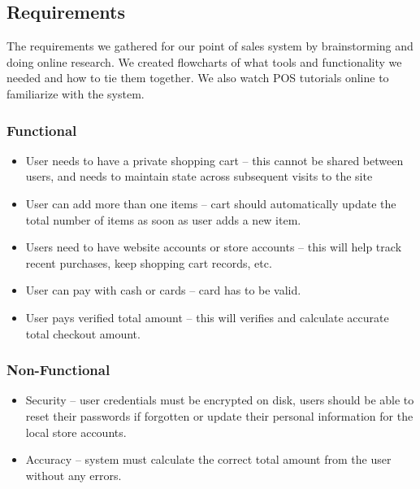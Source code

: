 \documentclass[10pt,conference,onecolumn,compsoc]{IEEEtran}
\begin{document}



\subsection{Requirements}
The requirements we gathered for our point of sales system by brainstorming and doing online research. We created flowcharts of what tools and functionality we needed and how to tie them together. We also watch POS tutorials online to familiarize with the system. 



\subsubsection{Functional}
\begin{itemize}
\item User needs to have a private shopping cart -- this cannot be shared between users, and needs to maintain state across subsequent visits to the site
\item User can add more than one items -- cart should automatically update the total number of items as soon as user adds a new item.
\item Users need to have website accounts or store accounts -- this will help track recent purchases, keep shopping cart records, etc. 
\item User can pay with cash or cards -- card has to be valid.
\item User pays verified total amount -- this will verifies and calculate accurate total checkout amount.

\end{itemize}

\subsubsection{Non-Functional}
\begin{itemize}
\item Security -- user credentials must be encrypted on disk, users should be able to reset their passwords if forgotten or update their personal information for the local store accounts.
\item Accuracy -- system must calculate the correct total amount from the user without any errors. 
\end{itemize}
\end{document}
